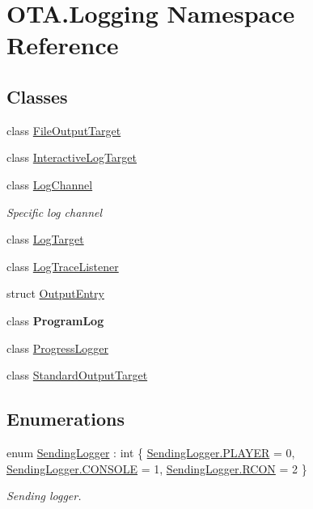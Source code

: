 \hypertarget{namespace_o_t_a_1_1_logging}{}\section{O\+T\+A.\+Logging Namespace Reference}
\label{namespace_o_t_a_1_1_logging}
\subsection*{Classes}
\begin{DoxyCompactItemize}
\item 
class \hyperlink{class_o_t_a_1_1_logging_1_1_file_output_target}{File\+Output\+Target}
\item 
class \hyperlink{class_o_t_a_1_1_logging_1_1_interactive_log_target}{Interactive\+Log\+Target}
\item 
class \hyperlink{class_o_t_a_1_1_logging_1_1_log_channel}{Log\+Channel}
\begin{DoxyCompactList}\small\item\em Specific log channel \end{DoxyCompactList}\item 
class \hyperlink{class_o_t_a_1_1_logging_1_1_log_target}{Log\+Target}
\item 
class \hyperlink{class_o_t_a_1_1_logging_1_1_log_trace_listener}{Log\+Trace\+Listener}
\item 
struct \hyperlink{struct_o_t_a_1_1_logging_1_1_output_entry}{Output\+Entry}
\item 
class {\bfseries Program\+Log}
\item 
class \hyperlink{class_o_t_a_1_1_logging_1_1_progress_logger}{Progress\+Logger}
\item 
class \hyperlink{class_o_t_a_1_1_logging_1_1_standard_output_target}{Standard\+Output\+Target}
\end{DoxyCompactItemize}
\subsection*{Enumerations}
\begin{DoxyCompactItemize}
\item 
enum \hyperlink{namespace_o_t_a_1_1_logging_a8bc0baa35da015be032d07e537448cb2}{Sending\+Logger} \+: int \{ \hyperlink{namespace_o_t_a_1_1_logging_a8bc0baa35da015be032d07e537448cb2a07c80e2a355d91402a00d82b1fa13855}{Sending\+Logger.\+P\+L\+A\+Y\+E\+R} = 0, 
\hyperlink{namespace_o_t_a_1_1_logging_a8bc0baa35da015be032d07e537448cb2a4695859f52d337ca3d7020b2c8f7882a}{Sending\+Logger.\+C\+O\+N\+S\+O\+L\+E} = 1, 
\hyperlink{namespace_o_t_a_1_1_logging_a8bc0baa35da015be032d07e537448cb2af2d3ec013c88e111064483739a50a7f4}{Sending\+Logger.\+R\+C\+O\+N} = 2
 \}\begin{DoxyCompactList}\small\item\em Sending logger. \end{DoxyCompactList}
\end{DoxyCompactItemize}


